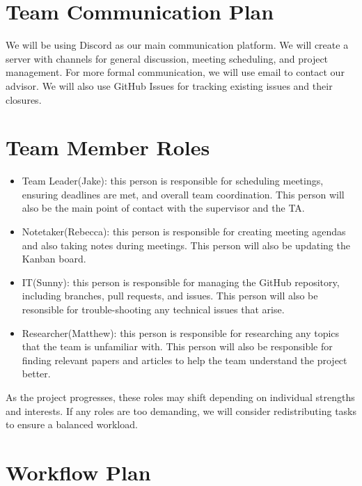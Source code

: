 \documentclass{article}
\begin{document}
\section{Team Communication Plan}

\raggedright
We will be using Discord as our main communication 
platform. We will create a server with channels for general 
discussion, meeting scheduling, and project management.
For more formal communication, we will use email to contact 
our advisor.
We will also use GitHub Issues for tracking existing 
issues and their closures.


\section{Team Member Roles}

\raggedright
\begin{itemize}
  \item Team Leader(Jake): this person is responsible for scheduling meetings,
    ensuring deadlines are met, and overall team coordination. This person will
    also be the main point of contact with the supervisor and the TA.
  \item Notetaker(Rebecca): this person is responsible for creating meeting agendas and also
    taking notes during meetings. This person will also be updating the Kanban
    board.
  \item IT(Sunny): this person is responsible for managing the GitHub repository, including
    branches, pull requests, and issues. This person will also be resonsible for trouble-shooting
    any technical issues that arise.
  \item Researcher(Matthew): this person is responsible for researching any topics that
    the team is unfamiliar with. This person will also be responsible for finding
    relevant papers and articles to help the team understand the project better.
\end{itemize}
As the project progresses, these roles may shift depending on individual strengths
and interests. If any roles are too demanding, we will consider redistributing tasks to
ensure a balanced workload.

\section{Workflow Plan}
\end{document}
